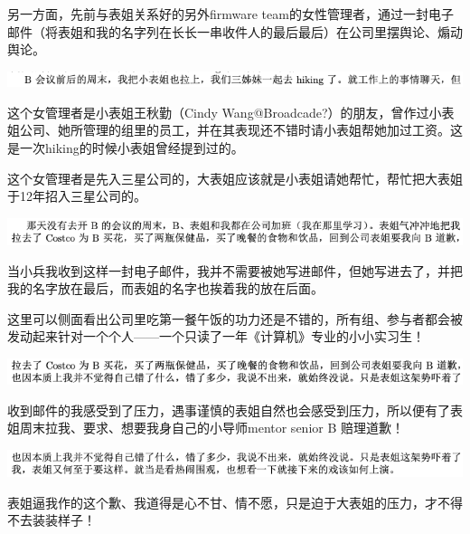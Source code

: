 \documentclass[9pt, b5paper]{article}
\begin{document}
另一方面，先前与表姐关系好的另外firmware team的女性管理者，通过一封电子邮件（将表姐和我的名字列在长长一串收件人的最后最后）在公司里摆舆论、煽动舆论。

\begin{center}
\includegraphics[width=.9\linewidth]{./pic/backups_plans_20210507_135623.png}
\end{center}

这个女管理者是小表姐王秋勤（Cindy Wang@Broadcade?）的朋友，曾作过小表姐公司、她所管理的组里的员工，并在其表现还不错时请小表姐帮她加过工资。这是一次hiking的时候小表姐曾经提到过的。  

这个女管理者是先入三星公司的，大表姐应该就是小表姐请她帮忙，帮忙把大表姐于12年招入三星公司的。

\begin{center}
\includegraphics[width=.9\linewidth]{./pic/backups_plans_20210507_092305.png}
\end{center}

当小兵我收到这样一封电子邮件，我并不需要被她写进邮件，但她写进去了，并把我的名字放在最后，而表姐的名字也挨着我的放在后面。

这里可以侧面看出公司里吃第一餐午饭的功力还是不错的，所有组、参与者都会被发动起来针对一个个人——一个只读了一年《计算机》专业的小小实习生！

\begin{center}
\includegraphics[width=.9\linewidth]{./pic/readme_20210508_094021.png}
\end{center}

收到邮件的我感受到了压力，遇事谨慎的表姐自然也会感受到压力，所以便有了表姐周末拉我、要求、想要我身自己的小导师mentor senior B 赔理道歉！

\begin{center}
\includegraphics[width=.9\linewidth]{./pic/backups_plans_20210507_092433.png}
\end{center}

表姐逼我作的这个歉、我道得是心不甘、情不愿，只是迫于大表姐的压力，才不得不去装装样子！
\end{document}
